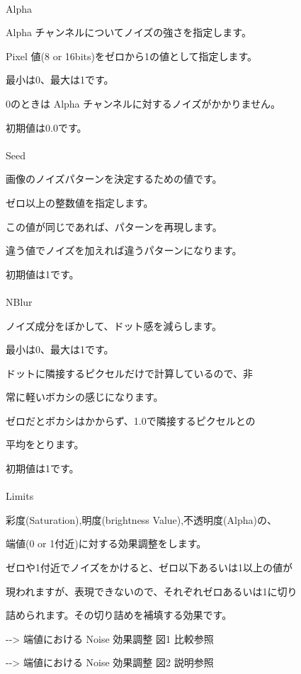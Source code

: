 \documentclass[a4paper,12pt]{article}
\begin{document}
\newpage

\thispagestyle{empty}

\ \vspace{-0.2em}
\par
\noindent Alpha\par
Alpha チャンネルについてノイズの強さを指定します。\par
Pixel 値(8 or 16bits)をゼロから1の値として指定します。\par
最小は0、最大は1です。\par
0のときは Alpha チャンネルに対するノイズがかかりません。\par
初期値は0.0です。\\
\\
Seed\par
画像のノイズパターンを決定するための値です。\par
ゼロ以上の整数値を指定します。\par
この値が同じであれば、パターンを再現します。\par
違う値でノイズを加えれば違うパターンになります。\par
初期値は1です。\\
\\
NBlur\par
ノイズ成分をぼかして、ドット感を減らします。\par
最小は0、最大は1です。\par
ドットに隣接するピクセルだけで計算しているので、非\par
常に軽いボカシの感じになります。\par
ゼロだとボカシはかからず、1.0で隣接するピクセルとの\par
平均をとります。\par
初期値は1です。\\
\\
Limits\par
彩度(Saturation),明度(brightness Value),不透明度(Alpha)の、\par
端値(0 or 1付近)に対する効果調整をします。\par
ゼロや1付近でノイズをかけると、ゼロ以下あるいは1以上の値が\par
現われますが、表現できないので、それぞれゼロあるいは1に切り\par
詰められます。その切り詰めを補填する効果です。\par
-{-}> \textquotedbl 端値における Noise 効果調整 図1 比較\textquotedbl 参照\par
-{-}> \textquotedbl 端値における Noise 効果調整 図2 説明\textquotedbl 参照\\
\end{document}
